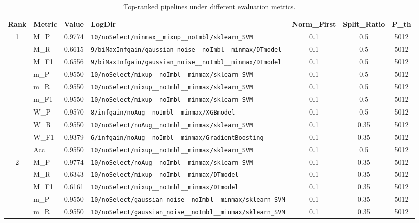 \begin{table}[htbp]
\caption{Top-ranked pipelines under different evaluation metrics.}
\label{tab:rank_metric_vertical}
\centering
\small
\setlength{\tabcolsep}{4pt}
\begin{tabular}{|c|l|c|>{\ttfamily\footnotesize}p{7.2cm}|c|c|c|}
\hline
Rank & Metric & Value & LogDir & Norm\_First & Split\_Ratio & P\_th \\
\hline
\multirow{10}{*}{1} & M\_P & 0.9774 & \texttt{10/noSelect/minmax\_\_mixup\_\_noImbl/sklearn\_SVM} & 0.1 & 0.5  & 5012 \\ 
 & M\_R & 0.6615 & \texttt{9/biMaxInfgain/gaussian\_noise\_\_noImbl\_\_minmax/DTmodel} & 0.1 & 0.5  & 5012 \\ 
 & M\_F1 & 0.6556 & \texttt{9/biMaxInfgain/gaussian\_noise\_\_noImbl\_\_minmax/DTmodel} & 0.1 & 0.5  & 5012 \\ 
 & m\_P & 0.9550 & \texttt{10/noSelect/mixup\_\_noImbl\_\_minmax/sklearn\_SVM} & 0.1 & 0.5  & 5012 \\ 
 & m\_R & 0.9550 & \texttt{10/noSelect/mixup\_\_noImbl\_\_minmax/sklearn\_SVM} & 0.1 & 0.5  & 5012 \\ 
 & m\_F1 & 0.9550 & \texttt{10/noSelect/mixup\_\_noImbl\_\_minmax/sklearn\_SVM} & 0.1 & 0.5  & 5012 \\ 
 & W\_P & 0.9570 & \texttt{8/infgain/noAug\_\_noImbl\_\_minmax/XGBmodel} & 0.1 & 0.5  & 5012 \\ 
 & W\_R & 0.9550 & \texttt{10/noSelect/noAug\_\_noImbl\_\_minmax/sklearn\_SVM} & 0.1 & 0.35  & 5012 \\ 
 & W\_F1 & 0.9379 & \texttt{6/infgain/noAug\_\_noImbl\_\_minmax/GradientBoosting} & 0.1 & 0.35  & 5012 \\ 
 & Acc & 0.9550 & \texttt{10/noSelect/mixup\_\_noImbl\_\_minmax/sklearn\_SVM} & 0.1 & 0.5  & 5012 \\ 
\hline
\multirow{10}{*}{2} & M\_P & 0.9774 & \texttt{10/noSelect/noAug\_\_noImbl\_\_minmax/sklearn\_SVM} & 0.1 & 0.35  & 5012 \\ 
 & M\_R & 0.6343 & \texttt{10/noSelect/mixup\_\_noImbl\_\_minmax/DTmodel} & 0.1 & 0.35  & 5012 \\ 
 & M\_F1 & 0.6161 & \texttt{10/noSelect/mixup\_\_noImbl\_\_minmax/DTmodel} & 0.1 & 0.35  & 5012 \\ 
 & m\_P & 0.9550 & \texttt{10/noSelect/gaussian\_noise\_\_noImbl\_\_minmax/sklearn\_SVM} & 0.1 & 0.35  & 5012 \\ 
 & m\_R & 0.9550 & \texttt{10/noSelect/gaussian\_noise\_\_noImbl\_\_minmax/sklearn\_SVM} & 0.1 & 0.35  & 5012 \\ 

\end{tabular}
\end{table}
